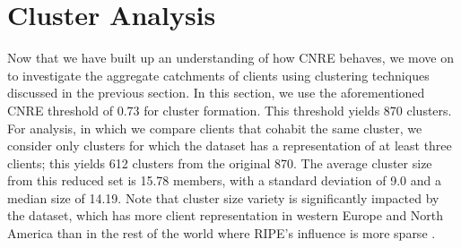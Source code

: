 \section{Cluster Analysis} \label{sect:analysis}

Now that we have built up an understanding of how CNRE behaves, we move on to
investigate the aggregate catchments of clients using clustering techniques
discussed in the previous section. In this section, we use the aforementioned
CNRE threshold of 0.73 for cluster formation. This threshold yields 870
clusters.  For analysis, in which we compare clients that cohabit the same
cluster, we consider only clusters for which the dataset has a representation of
at least three clients; this yields 612 clusters from the original 870. The
average cluster size from this reduced set is 15.78 members, with a standard
deviation of 9.0 and a median size of 14.19. Note that cluster size variety is
significantly impacted by the dataset, which has more client representation
in western Europe and North America than in the rest of the world where RIPE's
influence is more sparse \cite{ripe-atlas}.


